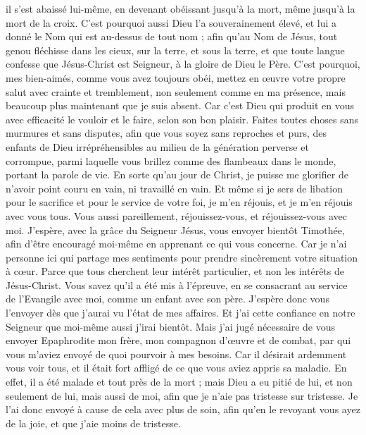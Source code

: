 \begin{multicols}{2}
il s'est abaissé lui-même, en devenant obéissant jusqu’à la mort, même jusqu’à la mort de la croix.
C'est pourquoi aussi Dieu l'a souverainement élevé, et lui a donné le Nom qui est au-dessus de tout nom ;
afin qu'au Nom de Jésus, tout genou fléchisse dans les cieux, sur la terre, et sous la terre,
et que toute langue confesse que Jésus-Christ est Seigneur, à la gloire de Dieu le Père.
C'est pourquoi, mes bien-aimés, comme vous avez toujours obéi, mettez en œuvre votre propre salut avec crainte et tremblement, non seulement comme en ma présence, mais beaucoup plus maintenant que je suis absent.
Car c'est Dieu qui produit en vous avec efficacité le vouloir et le faire, selon son bon plaisir.
Faites toutes choses sans murmures et sans disputes,
afin que vous soyez sans reproches et purs, des enfants de Dieu irrépréhensibles au milieu de la génération perverse et corrompue, parmi laquelle vous brillez comme des flambeaux dans le monde, portant la parole de vie.
En sorte qu’au jour de Christ, je puisse me glorifier de n'avoir point couru en vain, ni travaillé en vain.
Et même si je sers de libation pour le sacrifice et pour le service de votre foi, je m’en réjouis, et je m'en réjouis avec vous tous.
Vous aussi pareillement, réjouissez-vous, et réjouissez-vous avec moi.
J'espère, avec la grâce du Seigneur Jésus, vous envoyer bientôt Timothée, afin d’être encouragé moi-même en apprenant ce qui vous concerne.
Car je n'ai personne ici qui partage mes sentiments pour prendre sincèrement votre situation à cœur.
Parce que tous cherchent leur intérêt particulier, et non les intérêts de Jésus-Christ.
Vous savez qu’il a été mis à l’épreuve, en se consacrant au service de l’Evangile avec moi, comme un enfant avec son père.
J'espère donc vous l'envoyer dès que j'aurai vu l’état de mes affaires.
Et j’ai cette confiance en notre Seigneur que moi-même aussi j’irai bientôt.
Mais j'ai jugé nécessaire de vous envoyer Epaphrodite mon frère, mon compagnon d’œuvre et de combat, par qui vous m’aviez envoyé de quoi pourvoir à mes besoins.
Car il désirait ardemment vous voir tous, et il était fort affligé de ce que vous aviez appris sa maladie.
En effet, il a été malade et tout près de la mort ; mais Dieu a eu pitié de lui, et non seulement de lui, mais aussi de moi, afin que je n’aie pas tristesse sur tristesse.
Je l'ai donc envoyé à cause de cela avec plus de soin, afin qu'en le revoyant vous ayez de la joie, et que j'aie moins de tristesse.

\end{multicols}
